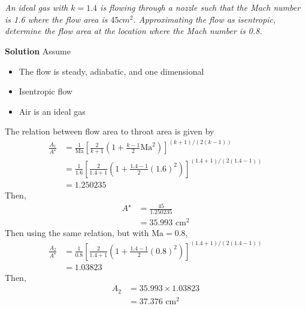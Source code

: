 \section{}

\textit{An ideal gas with $k = 1.4$ is flowing through a nozzle such that the Mach number is 1.6 where the flow area is $45 cm^2$. Approximating the flow as isentropic, determine the flow area at the location where the Mach number is 0.8.}

\textbf{Solution}
Assume
\begin{itemize}
    \item The flow is steady, adiabatic, and one dimensional
    \item Isentropic flow
    \item Air is an ideal gas
\end{itemize}

The relation between flow area to throat area is given by 
\begin{align*}
    \frac{A_1}{A^\star} &= \frac{1}{\text{Ma}} \left[ \frac{2}{k+1} \left( 1 + \frac{k-1}{2} \text{Ma}^2 \right) \right]^{(k+1)/(2(k-1))} \\
    &= \frac{1}{1.6} \left[ \frac{2}{1.4+1} \left( 1 + \frac{1.4-1}{2} (1.6)^2 \right) \right]^{(1.4+1)/(2(1.4-1))} \\
    &= 1.250235
\end{align*}
Then,
\begin{align*}
    A^\star &= \frac{45}{1.250235} \\
    &= 35.993 \text{ cm}^2
\end{align*}
Then using the same relation, but with $\text{Ma} = 0.8$,
\begin{align*}
    \frac{A_2}{A^\star} &= \frac{1}{0.8} \left[ \frac{2}{1.4+1} \left( 1 + \frac{1.4-1}{2} (0.8)^2 \right) \right]^{(1.4+1)/(2(1.4-1))} \\
    &= 1.03823
\end{align*}
Then,
\begin{align*}
    A_2 &= 35.993 \times 1.03823 \\
    &= \boxed{37.376 \text{ cm}^2}
\end{align*}